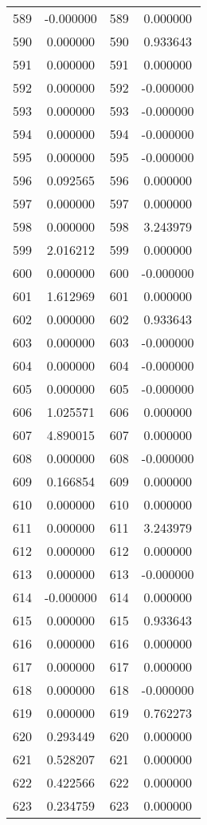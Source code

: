 \documentclass[12pt]{article}
\begin{document}
\begin{longtable}{@{}cccc@{}}
589 & -0.000000 & 589 & 0.000000 \\
590 & 0.000000 & 590 & 0.933643 \\
591 & 0.000000 & 591 & 0.000000 \\
592 & 0.000000 & 592 & -0.000000 \\
593 & 0.000000 & 593 & -0.000000 \\
594 & 0.000000 & 594 & -0.000000 \\
595 & 0.000000 & 595 & -0.000000 \\
596 & 0.092565 & 596 & 0.000000 \\
597 & 0.000000 & 597 & 0.000000 \\
598 & 0.000000 & 598 & 3.243979 \\
599 & 2.016212 & 599 & 0.000000 \\
600 & 0.000000 & 600 & -0.000000 \\
601 & 1.612969 & 601 & 0.000000 \\
602 & 0.000000 & 602 & 0.933643 \\
603 & 0.000000 & 603 & -0.000000 \\
604 & 0.000000 & 604 & -0.000000 \\
605 & 0.000000 & 605 & -0.000000 \\
606 & 1.025571 & 606 & 0.000000 \\
607 & 4.890015 & 607 & 0.000000 \\
608 & 0.000000 & 608 & -0.000000 \\
609 & 0.166854 & 609 & 0.000000 \\
610 & 0.000000 & 610 & 0.000000 \\
611 & 0.000000 & 611 & 3.243979 \\
612 & 0.000000 & 612 & 0.000000 \\
613 & 0.000000 & 613 & -0.000000 \\
614 & -0.000000 & 614 & 0.000000 \\
615 & 0.000000 & 615 & 0.933643 \\
616 & 0.000000 & 616 & 0.000000 \\
617 & 0.000000 & 617 & 0.000000 \\
618 & 0.000000 & 618 & -0.000000 \\
619 & 0.000000 & 619 & 0.762273 \\
620 & 0.293449 & 620 & 0.000000 \\
621 & 0.528207 & 621 & 0.000000 \\
622 & 0.422566 & 622 & 0.000000 \\
623 & 0.234759 & 623 & 0.000000 \\

\end{longtable}
\end{document}
